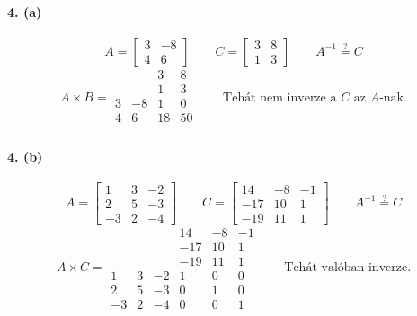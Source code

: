 \documentclass[12pt,a4paper,fleqn]{article}
\newcommand{\myparagraph}[1]{\paragraph{#1}\mbox{}}
\begin{document}
\myparagraph{4. (a)}
\[
  A = \begin{bmatrix} 3 & -8 \\ 4 & 6 \end{bmatrix} \qquad
  C = \begin{bmatrix} 3 & 8 \\ 1 & 3 \end{bmatrix} \qquad
  A^{-1} \stackrel{?}{=} C
\]
\[
  A \times B =
  \begin{array}{cc|cc}
     &    &  3 &  8 \\
     &    &  1 &  3 \\ \hline
   3 & -8 &  1 &  0 \\
   4 &  6 & 18 & 50 \\
  \end{array}
  \qquad
  \text{Tehát nem inverze a $C$ az $A$-nak.}
\]

\myparagraph{4. (b)}
\[
  A =
  \begin{bmatrix}
    1 & 3 & -2 \\
    2 & 5 & -3 \\
    -3 & 2 & -4
  \end{bmatrix}
  \qquad
  C =
  \begin{bmatrix}
    14 & -8 & -1 \\
    -17 & 10 & 1 \\
    -19 & 11 & 1
  \end{bmatrix}
  \qquad
  A^{-1} \stackrel{?}{=} C
\]
\[
  A \times C =
  \begin{array}{ccc|ccc}
      &   &    & 14  & -8 & -1 \\
      &   &    & -17 & 10 & 1 \\
      &   &    & -19 & 11 & 1 \\ \hline
   1  & 3 & -2 & 1   & 0 & 0 \\
   2  & 5 & -3 & 0   & 1 & 0 \\
   -3 & 2 & -4 & 0   & 0 & 1
  \end{array}
  \qquad \text{Tehát valóban inverze.}
\]
\end{document}
